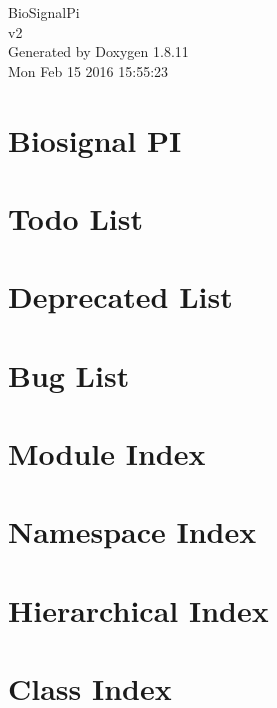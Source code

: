 \documentclass[twoside]{book}
\newcommand{\+}{\discretionary{\mbox{\scriptsize$\hookleftarrow$}}{}{}}
\newcommand{\clearemptydoublepage}{%
  \newpage{\pagestyle{empty}\cleardoublepage}%
}
\begin{document}
\hypersetup{pageanchor=false,
             bookmarks=true,
             bookmarksnumbered=true,
             pdfencoding=unicode
            }
\begin{titlepage}
\vspace*{7cm}
\begin{center}%
{\Large Bio\+Signal\+Pi \\[1ex]\large v2 }\\
\vspace*{1cm}
{\large Generated by Doxygen 1.8.11}\\
\vspace*{0.5cm}
{\small Mon Feb 15 2016 15:55:23}\\
\end{center}
\end{titlepage}
\clearemptydoublepage
\tableofcontents
\clearemptydoublepage
{}
\hypersetup{pageanchor=true}

\chapter{Biosignal PI}
\label{index}\hypertarget{index}{}
\chapter{Todo List}
\label{todo}
\hypertarget{todo}{}

\chapter{Deprecated List}
\label{deprecated}
\hypertarget{deprecated}{}

\chapter{Bug List}
\label{bug}
\hypertarget{bug}{}

\chapter{Module Index}

\chapter{Namespace Index}

\chapter{Hierarchical Index}

\chapter{Class Index}

\end{document}
